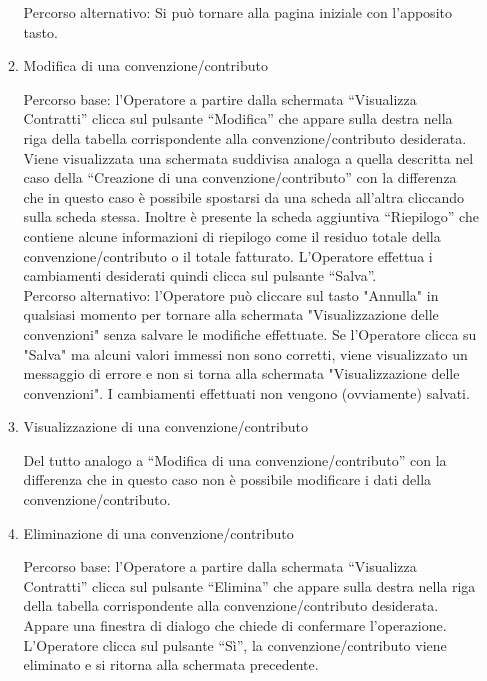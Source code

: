 \begin{enumerate}
\begin{enumerate}
  Percorso alternativo:
  Si può tornare alla pagina iniziale con l'apposito tasto.
 
  \item Modifica di una convenzione/contributo\\ \label{UC_edit_contract}
  
  Percorso base:
  l'Operatore a partire dalla schermata ``Visualizza Contratti'' clicca sul pulsante ``Modifica'' che appare sulla destra nella riga 
  della tabella corrispondente alla convenzione/contributo desiderata. Viene visualizzata una schermata suddivisa analoga a quella
  descritta nel caso della ``Creazione di una convenzione/contributo'' con la differenza che in questo caso è possibile spostarsi da una scheda all'altra
  cliccando sulla scheda stessa. Inoltre è presente la scheda aggiuntiva ``Riepilogo'' che contiene alcune informazioni di riepilogo come il residuo
  totale della convenzione/contributo o il totale fatturato.
  L'Operatore effettua i cambiamenti desiderati quindi clicca sul pulsante ``Salva''.\\

  Percorso alternativo:
  l'Operatore può cliccare sul tasto "Annulla" in qualsiasi momento per tornare alla schermata "Visualizzazione delle convenzioni" senza salvare le modifiche effettuate.
  Se l'Operatore clicca su "Salva" ma alcuni valori immessi non sono corretti, viene visualizzato un messaggio di errore e non si torna alla schermata "Visualizzazione delle
  convenzioni". I cambiamenti effettuati non vengono (ovviamente) salvati.
  
  \item Visualizzazione di una convenzione/contributo\\ \label{UC_view_contract}
 
  Del tutto analogo a ``Modifica di una convenzione/contributo'' con la differenza che in questo caso non è possibile modificare i dati della
  convenzione/contributo.
  
  \item Eliminazione di una convenzione/contributo\\ \label{UC_delete_contract}
  
  Percorso base:
  l'Operatore a partire dalla schermata ``Visualizza Contratti'' clicca sul pulsante ``Elimina'' che appare sulla destra nella riga 
  della tabella corrispondente alla convenzione/contributo desiderata. Appare una finestra di dialogo che chiede di confermare l'operazione. L'Operatore clicca sul pulsante ``Sì'', la convenzione/contributo viene eliminato e si
  ritorna alla schermata precedente.
  

\end{enumerate}
\end{enumerate}

